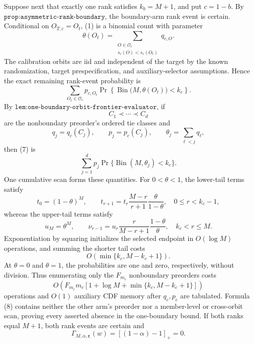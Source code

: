 Suppose next that exactly one rank satisfies \(k_b=M+1\), and put \(c=1-b\). By \(\texttt{prop:asymmetric-rank-boundary}\), the boundary-arm rank event is certain. Conditional on \(O_{T,c}=O_t\), (1) is a binomial count with parameter
\[
\theta(O_t)=\sum_{\substack{O\in\mathcal O_c\\s_c(O)<s_c(O_t)}}q_{c,O}.
\tag{6}
\]
The calibration orbits are iid and independent of the target by the known randomization, target prespecification, and auxiliary-selector assumptions. Hence the exact remaining rank-event probability is
\[
\sum_{O_t\in\mathcal O_c}p_{c,O_t}
 \Pr\!\left\{\operatorname{Bin}\bigl(M,\theta(O_t)\bigr)<k_c\right\}.
\tag{7}
\]
By \(\texttt{lem:one-boundary-orbit-frontier-evaluator}\), if
\[
C_1\prec\cdots\prec C_d
\]
are the nonboundary preorder's ordered tie classes and
\[
q_j=q_c(C_j),\qquad p_j=p_c(C_j),\qquad
\theta_j=\sum_{\ell<j}q_\ell,
\]
then (7) is
\[
\sum_{j=1}^d p_j\Pr\{\operatorname{Bin}(M,\theta_j)<k_c\}.
\tag{8}
\]
One cumulative scan forms these quantities. For \(0<\theta<1\), the lower-tail terms satisfy
\[
t_0=(1-\theta)^M,\qquad
t_{r+1}=t_r\frac{M-r}{r+1}\frac{\theta}{1-\theta},
\quad 0\le r<k_c-1,
\tag{9}
\]
whereas the upper-tail terms satisfy
\[
u_M=\theta^M,\qquad\nu_{r-1}=u_r\frac r{M-r+1}\frac{1-\theta}{\theta},
\quad k_c<r\le M.
\tag{10}
\]
Exponentiation by squaring initializes the selected endpoint in \(O(\log M)\) operations, and summing the shorter tail costs
\[
O(\min\{k_c,M-k_c+1\}).
\]
At \(\theta=0\) and \(\theta=1\), the probabilities are one and zero, respectively, without division. Thus enumerating only the \(F_{m_c}\) nonboundary preorders costs
\[
O\!\left(
F_{m_c}m_c
\left[1+\log M+\min\{k_c,M-k_c+1\}\right]
\right)
\tag{11}
\]
operations and \(O(1)\) auxiliary CDF memory after \(q_c,p_c\) are tabulated. Formula (8) contains neither the other arm's preorder nor a member-level or cross-orbit scan, proving every asserted absence in the one-boundary bound. If both ranks equal \(M+1\), both rank events are certain and
\[
\Gamma_{M,\alpha,\boldsymbol\varepsilon}(w)
 =[(1-\alpha)-1]_+=0.
\tag{12}
\]

